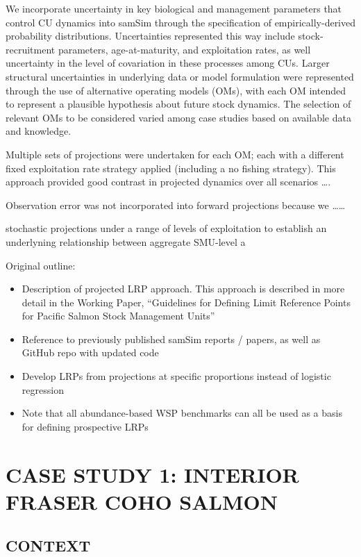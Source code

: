 \documentclass[11pt]{book}
\begin{document}
We incorporate uncertainty in key biological and management parameters that control CU dynamics into samSim through the specification of empirically-derived probability distributions. Uncertainties represented this way include stock-recruitment parameters, age-at-maturity, and exploitation rates, as well uncertainty in the level of covariation in these processes among CUs. Larger structural uncertainties in underlying data or model formulation were represented through the use of alternative operating models (OMs), with each OM intended to represent a plausible hypothesis about future stock dynamics. The selection of relevant OMs to be considered varied among case studies based on available data and knowledge.

Multiple sets of projections were undertaken for each OM; each with a different fixed exploitation rate strategy applied (including a no fishing strategy). This approach provided good contrast in projected dynamics over all scenarios \ldots.

Observation error was not incorporated into forward projections because we \ldots\ldots{}

stochastic projections under a range of levels of exploitation to establish an underlyning relationship between aggregate SMU-level a

Original outline:
\begin{itemize}
\item
  Description of projected LRP approach. This approach is described in more detail in the Working Paper, ``Guidelines for Defining Limit Reference Points for Pacific Salmon Stock Management Units''
\item
  Reference to previously published samSim reports / papers, as well as GitHub repo with updated code
\item
  Develop LRPs from projections at specific proportions instead of logistic regression
\item
  Note that all abundance-based WSP benchmarks can all be used as a basis for defining prospective LRPs
\end{itemize}
\hypertarget{case-study-1-interior-fraser-coho-salmon}{%
\section{CASE STUDY 1: INTERIOR FRASER COHO SALMON}\label{case-study-1-interior-fraser-coho-salmon}}

\hypertarget{context}{%
\subsection{CONTEXT}\label{context}}
\end{document}
